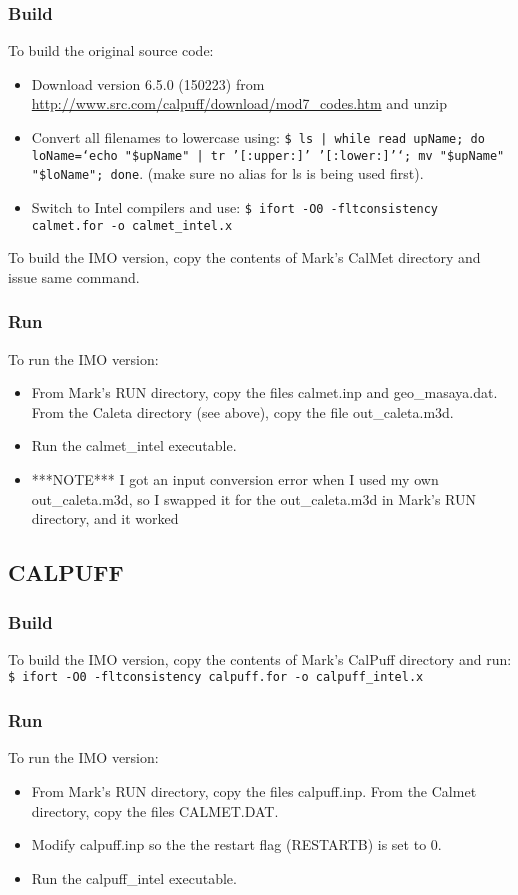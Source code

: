 \documentclass[10pt,a4paper]{article}
\begin{document}
\subsubsection{Build}
To build the original source code:
\begin{itemize}
\item Download version 6.5.0 (150223) from \url{http://www.src.com/calpuff/download/mod7_codes.htm} and unzip
\item Convert all filenames to lowercase using: \texttt{\$ ls | while read upName; do loName=`echo "\${upName}" | tr '[:upper:]' '[:lower:]'`; mv "\$upName" "\$loName"; done}. (make sure no alias for ls is being used first).
\item Switch to Intel compilers and use: \texttt{\$ ifort -O0 -fltconsistency calmet.for -o calmet\_intel.x}
\end{itemize}
To build the IMO version, copy the contents of Mark's CalMet directory and issue same command.

\subsubsection{Run}
To run the IMO version:
\begin{itemize}
\item From Mark's RUN directory, copy the files calmet.inp and geo\_masaya.dat. From the Caleta directory (see above), copy the file out\_caleta.m3d.
\item Run the calmet\_intel executable.
\item ***NOTE*** I got an input conversion error when I used my own out\_caleta.m3d, so I swapped it for the out\_caleta.m3d in Mark's RUN directory, and it worked 
\end{itemize}

\subsection{CALPUFF}
\subsubsection{Build}
To build the IMO version, copy the contents of Mark's CalPuff directory and run: \texttt{\$ ifort -O0 -fltconsistency calpuff.for -o calpuff\_intel.x}

\subsubsection{Run}
To run the IMO version:
\begin{itemize}
\item From Mark's RUN directory, copy the files calpuff.inp. From the Calmet directory, copy the files CALMET.DAT.
\item Modify calpuff.inp so the the restart flag (RESTARTB) is set to 0.
\item Run the calpuff\_intel executable.
\end{itemize}
\end{document}
